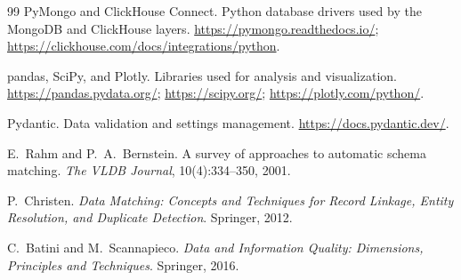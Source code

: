 \documentclass[10pt,a4paper,twocolumn]{article}
\begin{document}
\begin{thebibliography}{99}
PyMongo and ClickHouse Connect.
\newblock Python database drivers used by the MongoDB and ClickHouse layers.
\newblock \url{https://pymongo.readthedocs.io/}; \url{https://clickhouse.com/docs/integrations/python}.

pandas, SciPy, and Plotly.
\newblock Libraries used for analysis and visualization.
\newblock \url{https://pandas.pydata.org/}; \url{https://scipy.org/}; \url{https://plotly.com/python/}.

Pydantic.
\newblock Data validation and settings management.
\newblock \url{https://docs.pydantic.dev/}.

E.~Rahm and P.~A.~Bernstein.
\newblock A survey of approaches to automatic schema matching.
\newblock \textit{The VLDB Journal}, 10(4):334--350, 2001.

P.~Christen.
\newblock \textit{Data Matching: Concepts and Techniques for Record Linkage, Entity Resolution, and Duplicate Detection}.
\newblock Springer, 2012.

C.~Batini and M.~Scannapieco.
\newblock \textit{Data and Information Quality: Dimensions, Principles and Techniques}.
\newblock Springer, 2016.

\end{thebibliography}
\endgroup

\clearpage
\onecolumn
\appendix
\renewcommand{\theHsection}{appendix.\Alph{section}}
\renewcommand{\theHsubsection}{appendix.\Alph{section}.\arabic{subsection}}
\renewcommand{\theHsubsubsection}{appendix.\Alph{section}.\arabic{subsection}.\arabic{subsubsection}}

\end{document}
